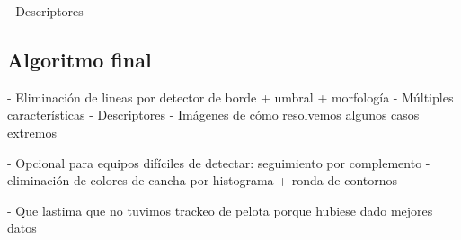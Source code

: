 - Descriptores

\subsection{Algoritmo final}
\label{sec:alg-final}

- Eliminación de lineas por detector de borde + umbral + morfología
- Múltiples características
- Descriptores
- Imágenes de cómo resolvemos algunos casos extremos

- Opcional para equipos difíciles de detectar: seguimiento por complemento
  - eliminación de colores de cancha por histograma + ronda de contornos

- Que lastima que no tuvimos trackeo de pelota porque hubiese dado mejores datos

